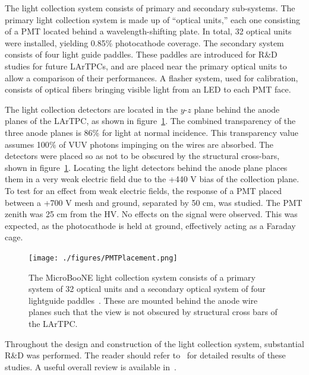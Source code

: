The light collection system consists of primary and secondary sub-systems.  The primary light collection system is made up of ``optical units,'' each one consisting of a PMT located behind a wavelength-shifting plate.  In total, 32 optical units were installed, yielding 0.85\% photocathode coverage.  The secondary system consists of four light guide paddles.   These paddles are introduced for R\&D studies for future LArTPCs, and are placed near the primary optical units to allow a comparison of their performances.  A flasher system, used for calibration, consists of optical fibers bringing visible light from an LED to each PMT face.

The light collection detectors are located in the $y$-$z$ plane behind the anode planes of the LArTPC, as shown in figure~\ref{fig:lightlayout}.  The combined transparency of the three anode planes is 86\% for light at normal incidence.  This transparency value assumes 100$\%$ of VUV photons impinging on the wires are absorbed.  The detectors were placed so as not to be obscured by the \lartpc structural cross-bars, shown in figure~\ref{fig:lightlayout}.  Locating the light detectors behind the anode plane places them in a very weak electric field due to the +440 V bias of the collection plane.  To test for an effect from weak electric fields, the response of a PMT placed between a +700 V mesh and ground, separated by 50 cm, was studied.  The PMT zenith was 25 cm from the HV.   No effects on the signal were observed.  This was expected, as the photocathode is held at ground, effectively acting as a Faraday cage.  
\begin{figure}
	\centering
              \texttt{[image: ./figures/PMTPlacement.png]} 
        \caption{The MicroBooNE light collection system consists of a primary system of 32 optical units and a secondary optical system of four lightguide paddles~\cite{Katori:2013wqa}. These are mounted behind the anode wire planes such that the view is not obscured by structural cross bars of the LArTPC. }\label{fig:lightlayout}
\end{figure}


Throughout the design and construction of the light collection system,  substantial R\&D was performed.   The reader should refer to~\cite{Jones:2013bca,Bugel:2011xg,Katori:2011uq,Chiu:2012,Baptista:2012,Briese:2013wua,Jones:2013mfa,Katori:2013wqa,Moss:2014ota,Conrad:2015xta,Moss:2015hha} for detailed results of these studies.    A useful overall review is available in~\cite{Jones:2015bya}. 

